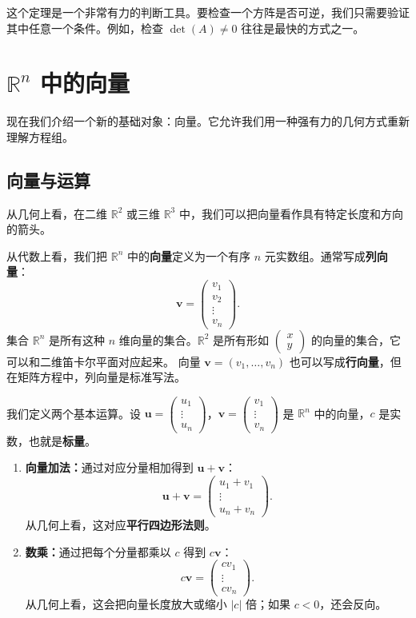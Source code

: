 这个定理是一个非常有力的判断工具。要检查一个方阵是否可逆，我们只需要验证其中任意一个条件。例如，检查 $\det(A)\neq0$ 往往是最快的方式之一。

\section{\texorpdfstring{$\mathbb{R}^n$}{Rn} 中的向量}

现在我们介绍一个新的基础对象：向量。它允许我们用一种强有力的几何方式重新理解方程组。

\subsection{向量与运算}
从几何上看，在二维 $\mathbb{R}^2$ 或三维 $\mathbb{R}^3$ 中，我们可以把向量看作具有特定长度和方向的箭头。

从代数上看，我们把 $\mathbb{R}^n$ 中的\textbf{向量}定义为一个有序 $n$ 元实数组。通常写成\textbf{列向量}：
\[ \mathbf{v}=\begin{pmatrix}v_1\\v_2\\\vdots\\v_n\end{pmatrix}. \]
集合 $\mathbb{R}^n$ 是所有这种 $n$ 维向量的集合。$\mathbb{R}^2$ 是所有形如 $\begin{pmatrix}x\\y\end{pmatrix}$ 的向量的集合，它可以和二维笛卡尔平面对应起来。
向量 $\mathbf{v}=(v_1,\ldots,v_n)$ 也可以写成\textbf{行向量}，但在矩阵方程中，列向量是标准写法。

我们定义两个基本运算。设 $\mathbf{u}=\begin{pmatrix}u_1\\\vdots\\u_n\end{pmatrix}$，$\mathbf{v}=\begin{pmatrix}v_1\\\vdots\\v_n\end{pmatrix}$ 是 $\mathbb{R}^n$ 中的向量，$c$ 是实数，也就是\textbf{标量}。

\begin{enumerate}
    \item \textbf{向量加法：}通过对应分量相加得到 $\mathbf{u}+\mathbf{v}$：
    \[ \mathbf{u}+\mathbf{v}=\begin{pmatrix}u_1+v_1\\\vdots\\u_n+v_n\end{pmatrix}. \]
    从几何上看，这对应\textbf{平行四边形法则}。
    \item \textbf{数乘：}通过把每个分量都乘以 $c$ 得到 $c\mathbf{v}$：
    \[ c\mathbf{v}=\begin{pmatrix}cv_1\\\vdots\\cv_n\end{pmatrix}. \]
    从几何上看，这会把向量长度放大或缩小 $|c|$ 倍；如果 $c<0$，还会反向。
\end{enumerate}

